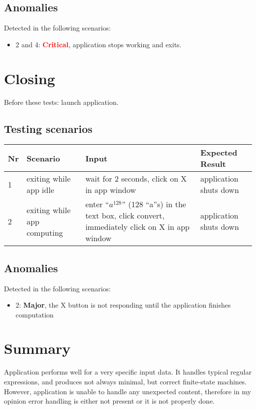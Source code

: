 \documentclass{article}
\newcommand{\errormajor}{\textbf{Major}, }
\newcommand{\errorcritical}{\textbf{\textcolor{red}{Critical}}, }
\begin{document}
\subsection{Anomalies}
Detected in the following scenarios:
\begin{itemize}

  \item 2 and 4: \errorcritical application stops working and exits.

\end{itemize}

\section{Closing}
Before these tests: launch application.

\subsection{Testing scenarios}

\begin{center}
\begin{tabularx}{\textwidth}{llXX}
\toprule
\textbf{Nr} & \textbf{Scenario} & \textbf{Input} & \textbf{Expected Result}  \\
\midrule
1 & exiting while app idle
& wait for 2 seconds, click on X in app window
& application shuts down \\
\midrule
2 & exiting while app computing
& enter ``$ a^{128} $'' (128 ``a''s) in the text box, click convert, immediately click on X in app window
& application shuts down \\
\bottomrule
\end{tabularx}
\end{center}

\subsection{Anomalies}
Detected in the following scenarios:
\begin{itemize}

  \item 2: \errormajor the X button is not responding until the application finishes computation

\end{itemize}

\newpage

\section{Summary}
Application performs well for a very specific input data. It handles typical regular expressions,
and produces not always minimal, but correct finite-state machines. However, application is unable
to handle any unexpected content, therefore in my opinion error handling is either not present or it
is not properly done.
\end{document}

